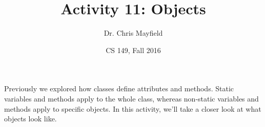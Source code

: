 \documentclass[12pt]{article}
\title{Activity 11: Objects}
\author{Dr. Chris Mayfield}
\date{CS 149, Fall 2016}
\begin{document}
\maketitle

Previously we explored how classes define attributes and methods.
Static variables and methods apply to the whole class, whereas non-static variables and methods apply to specific objects. In this activity, we'll take a closer look at what objects look like.


\newpage

\end{document}
